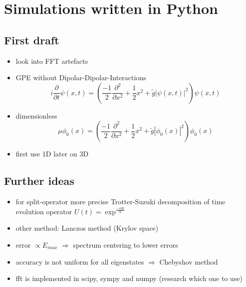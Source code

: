 \section{Simulations written in Python}

\subsection{First draft}
\begin{itemize}
    \item look into FFT artefacts
    \item GPE without Dipolar-Dipolar-Interactions
    \begin{equation}
        i \frac{\partial}{\partial t} \psi(x,t) = \left(\frac{-1}{2} \frac{\partial^{2}}{\partial x^{2}} + \frac{1}{2} x^{2} + \tilde{g} |\psi(x,t)|^{2} \right) \psi(x,t)
    \end{equation}
    \item dimensionless
    \begin{equation}
        \mu \phi_{0}(x) = \left(\frac{-1}{2} \frac{\partial^{2}}{\partial x^{2}} + \frac{1}{2} x^{2} + \tilde{g} |\phi_{0}(x)|^{2} \right) \phi_{0}(x)
    \end{equation}
    \item first use 1D later on 3D
\end{itemize}

\subsection{Further ideas}
\begin{itemize}
    \item for split-operator more precise Trotter-Suzuki decomposition of time evolution operator $U(t) = \exp^{\frac{-i H t}{\hbar} }$
    \item other method: Lanczos method (Krylov space)
    \item error $\propto E_{max}$ $\Rightarrow$ spectrum centering to lower errors
    \item accuracy is not uniform for all eigenstates $\Rightarrow$ Chebyshov method
    \item fft is implemented in scipy, sympy and numpy (research which one to use)
\end{itemize}


